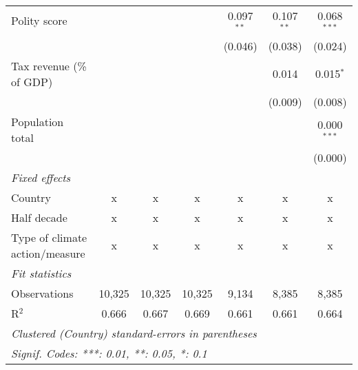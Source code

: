 \begin{tabular}{lcccccc}
   Polity score                                                      &               &               &                & 0.097$^{**}$   & 0.107$^{**}$   & 0.068$^{***}$\\   
                                                                     &               &               &                & (0.046)        & (0.038)        & (0.024)\\   
   Tax revenue (\% of GDP)                                           &               &               &                &                & 0.014          & 0.015$^{*}$\\   
                                                                     &               &               &                &                & (0.009)        & (0.008)\\   
   Population total                                                  &               &               &                &                &                & 0.000$^{***}$\\   
                                                                     &               &               &                &                &                & (0.000)\\   
   \emph{Fixed effects}\\
   Country                                                           & x             & x             & x              & x              & x              & x\\  
   Half decade                                                       & x             & x             & x              & x              & x              & x\\  
   Type of climate action/measure                                    & x             & x             & x              & x              & x              & x\\  
   \midrule \emph{Fit statistics}\\
   Observations                                                      & 10,325        & 10,325        & 10,325         & 9,134          & 8,385          & 8,385\\  
   R$^2$                                                             & 0.666         & 0.667         & 0.669          & 0.661          & 0.661          & 0.664\\  
   \midrule
   \multicolumn{7}{l}{\emph{Clustered (Country) standard-errors in parentheses}}\\
   \multicolumn{7}{l}{\emph{Signif. Codes: ***: 0.01, **: 0.05, *: 0.1}}\\
\end{tabular}
\par\endgroup


